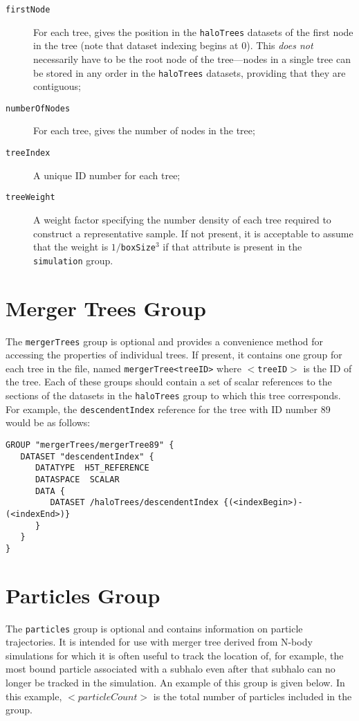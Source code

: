\begin{description}
 \item [{\tt firstNode}] For each tree, gives the position in the {\tt haloTrees} datasets of the first node in the tree (note that dataset indexing begins at 0). This \emph{does not} necessarily have to be the root node of the tree---nodes in a single tree can be stored in any order in the {\tt haloTrees} datasets, providing that they are contiguous;
 \item [{\tt numberOfNodes}] For each tree, gives the number of nodes in the tree;
 \item [{\tt treeIndex}] A unique ID number for each tree;
 \item [{\tt treeWeight}] A weight factor specifying the number density of each tree required to construct a representative sample. If not present, it is acceptable to assume that the weight is $1/${\tt boxSize}$^3$ if that attribute is present in the {\tt simulation} group.
\end{description}

\section{Merger Trees Group}

The {\tt mergerTrees} group is optional and provides a convenience method for accessing the properties of individual trees. If present, it contains one group for each tree in the file, named {\tt mergerTree<treeID>} where {\tt $<$treeID$>$} is the ID of the tree. Each of these groups should contain a set of scalar references to the sections of the datasets in the {\tt haloTrees} group to which this tree corresponds. For example, the {\tt descendentIndex} reference for the tree with ID number 89 would be as follows:

\begin{verbatim}
GROUP "mergerTrees/mergerTree89" {
   DATASET "descendentIndex" {
      DATATYPE  H5T_REFERENCE
      DATASPACE  SCALAR
      DATA {
         DATASET /haloTrees/descendentIndex {(<indexBegin>)-(<indexEnd>)}
      }
   }
}
\end{verbatim}

\section{Particles Group}

The {\tt particles} group is optional and contains information on particle trajectories. It is intended for use with merger tree derived from N-body simulations for which it is often useful to track the location of, for example, the most bound particle associated with a subhalo even after that subhalo can no longer be tracked in the simulation. An example of this group is given below. In this example, {\tt $<particleCount>$} is the total number of particles included in the group.

